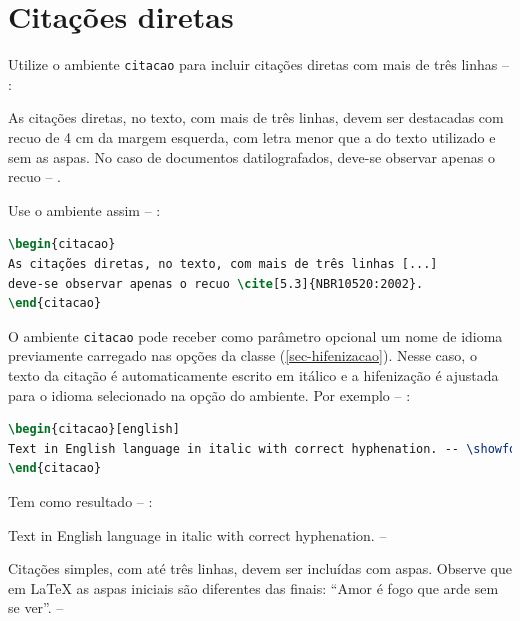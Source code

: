 \section{Citações diretas}
\label{sec-citacao}

Utilize o ambiente \texttt{citacao} para incluir
citações diretas com mais de três linhas -- \showfont:

\begin{citacao}
    As citações diretas, no texto, com mais de três linhas, devem ser
    destacadas com recuo de 4 cm da margem esquerda, com letra menor que a do texto
    utilizado e sem as aspas. No caso de documentos datilografados, deve-se
    observar apenas o recuo \cite[5.3]{NBR10520:2002} -- \showfont.
\end{citacao}

Use o ambiente assim -- \showfont:

\begin{lstlisting}[language=tex]
\begin{citacao}
As citações diretas, no texto, com mais de três linhas [...]
deve-se observar apenas o recuo \cite[5.3]{NBR10520:2002}.
\end{citacao}
\end{lstlisting}



O ambiente \texttt{citacao} pode receber como parâmetro opcional um nome de
idioma previamente carregado nas opções da classe (\autoref{sec-hifenizacao}). Nesse
caso, o texto da citação é automaticamente escrito em itálico e a hifenização é
ajustada para o idioma selecionado na opção do ambiente. Por exemplo -- \showfont:

\begin{lstlisting}[language=tex]
\begin{citacao}[english]
Text in English language in italic with correct hyphenation. -- \showfont
\end{citacao}
\end{lstlisting}

Tem como resultado -- \showfont:

\begin{citacao}[english]
    Text in English language in italic with correct hyphenation. -- \showfont
\end{citacao}

Citações simples, com até três linhas, devem ser
incluídas com aspas. Observe que em \LaTeX{} as aspas iniciais são diferentes das
finais: ``Amor é fogo que arde sem se ver''. -- \showfont

